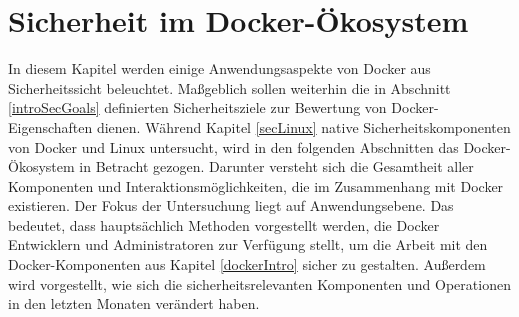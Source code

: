 \documentclass[../main.tex]{subfiles}
\begin{document}



\chapter{Sicherheit im Docker-Ökosystem}
\label{secEcosystem}
  In diesem Kapitel werden einige Anwendungsaspekte von Docker aus Sicherheitssicht beleuchtet. Maßgeblich sollen weiterhin die in Abschnitt \ref{introSecGoals} definierten Sicherheitsziele zur Bewertung von Docker-Eigenschaften dienen. Während Kapitel \ref{secLinux} native Sicherheitskomponenten von Docker und Linux untersucht, wird in den folgenden Abschnitten das Docker-Ökosystem in Betracht gezogen. Darunter versteht sich die Gesamtheit aller Komponenten und Interaktionsmöglichkeiten, die im Zusammenhang mit Docker existieren. Der Fokus der Untersuchung liegt auf Anwendungsebene. Das bedeutet, dass hauptsächlich Methoden vorgestellt werden, die Docker Entwicklern und Administratoren zur Verfügung stellt, um die Arbeit mit den Docker-Komponenten aus Kapitel \ref{dockerIntro} sicher zu gestalten. Außerdem wird vorgestellt, wie sich die sicherheitsrelevanten Komponenten und Operationen in den letzten Monaten verändert haben.




\end{document}

